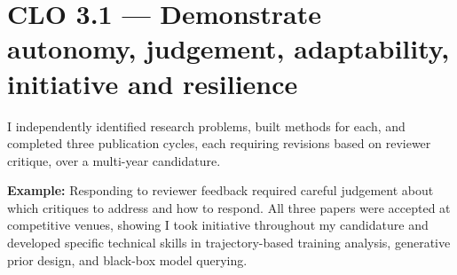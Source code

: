 \documentclass[11pt,a4paper]{book}
\begin{document}
\section{CLO 3.1 --- Demonstrate autonomy, judgement, adaptability, initiative and resilience}
\begin{foldable}
  I independently identified research problems, built methods for each, and completed three publication cycles, each requiring revisions based on reviewer critique, over a multi-year candidature.
\end{foldable}

\begin{foldable}
  \textbf{Example:} Responding to reviewer feedback required careful judgement about which critiques to address and how to respond. All three papers were accepted at competitive venues, showing I took initiative throughout my candidature and developed specific technical skills in trajectory-based training analysis, generative prior design, and black-box model querying.
\end{foldable}
\end{document}
